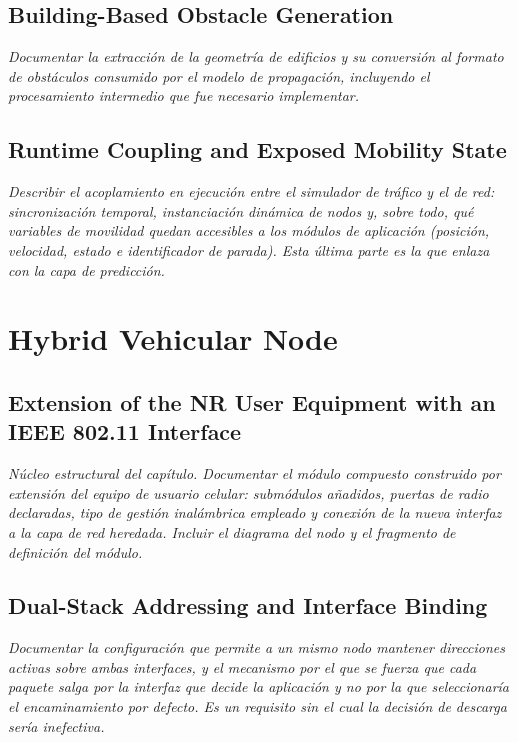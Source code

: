 \subsection{Building-Based Obstacle Generation}
\emph{Documentar la extracción de la geometría de edificios y su conversión al
formato de obstáculos consumido por el modelo de propagación, incluyendo el
procesamiento intermedio que fue necesario implementar.}

\subsection{Runtime Coupling and Exposed Mobility State}
\emph{Describir el acoplamiento en ejecución entre el simulador de tráfico y el
de red: sincronización temporal, instanciación dinámica de nodos y, sobre todo,
qué variables de movilidad quedan accesibles a los módulos de aplicación
(posición, velocidad, estado e identificador de parada). Esta última parte es la que
enlaza con la capa de predicción.}

\section{Hybrid Vehicular Node}

\subsection{Extension of the NR User Equipment with an IEEE 802.11 Interface}
\emph{Núcleo estructural del capítulo. Documentar el módulo compuesto construido
por extensión del equipo de usuario celular: submódulos añadidos, puertas de
radio declaradas, tipo de gestión inalámbrica empleado y conexión de la nueva
interfaz a la capa de red heredada. Incluir el diagrama del nodo y el fragmento
de definición del módulo.}

\subsection{Dual-Stack Addressing and Interface Binding}
\emph{Documentar la configuración que permite a un mismo nodo mantener
direcciones activas sobre ambas interfaces, y el mecanismo por el que se fuerza
que cada paquete salga por la interfaz que decide la aplicación y no por la que
seleccionaría el encaminamiento por defecto. Es un requisito sin el cual la
decisión de descarga sería inefectiva.}

